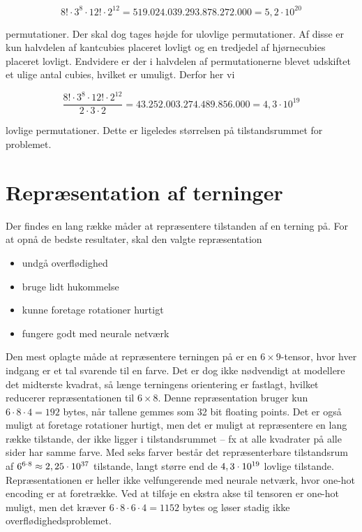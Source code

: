 \documentclass[../main.tex]{subfiles}
\begin{document}
$$8!\cdot3^8\cdot12!\cdot2^{12}=519.024.039.293.878.272.000=5,2\cdot10^{20}$$

permutationer. Der skal dog tages højde for ulovlige permutationer. Af disse er kun halvdelen af kantcubies placeret lovligt og en tredjedel af hjørnecubies placeret lovligt. Endvidere er der i halvdelen af permutationerne blevet udskiftet et ulige antal cubies, hvilket er umuligt. Derfor her vi

$$\frac{8!\cdot3^8\cdot12!\cdot2^{12}}{2\cdot3\cdot2}=43.252.003.274.489.856.000=4,3\cdot10^{19}$$

lovlige permutationer. Dette er ligeledes størrelsen på tilstandsrummet for problemet.

\section{Repræsentation af terninger}\label{sec:repr}
Der findes en lang række måder at repræsentere tilstanden af en terning på.
For at opnå de bedste resultater, skal den valgte repræsentation
\begin{itemize}
	\item undgå overflødighed
	\item bruge lidt hukommelse
	\item kunne foretage rotationer hurtigt
	\item fungere godt med neurale netværk
\end{itemize}
Den mest oplagte måde at repræsentere terningen på er en $ 6\times 9 $-tensor, hvor hver indgang er et tal svarende til en farve.
Det er dog ikke nødvendigt at modellere det midterste kvadrat, så længe terningens orientering er fastlagt, hvilket reducerer repræsentationen til $ 6\times 8 $.
Denne repræsentation bruger kun $ 6\cdot 8\cdot 4=192 $ bytes, når tallene gemmes som 32 bit floating points.
Det er også muligt at foretage rotationer hurtigt, men det er muligt at repræsentere en lang række tilstande, der ikke ligger i tilstandsrummet -- fx at alle kvadrater på alle sider har samme farve.
Med seks farver består det repræsenterbare tilstandsrum af $ 6^{6\cdot 8}\approx 2,25\cdot10^{37} $ tilstande, langt større end de $ 4,3\cdot10^{19} $ lovlige tilstande.
Repræsentationen er heller ikke velfungerende med neurale netværk, hvor one-hot encoding er at foretrække.
Ved at tilføje en ekstra akse til tensoren er one-hot muligt, men det kræver $ 6\cdot 8\cdot 6\cdot 4=1152 $ bytes og løser stadig ikke overflødighedsproblemet.\\
\\
\end{document}
